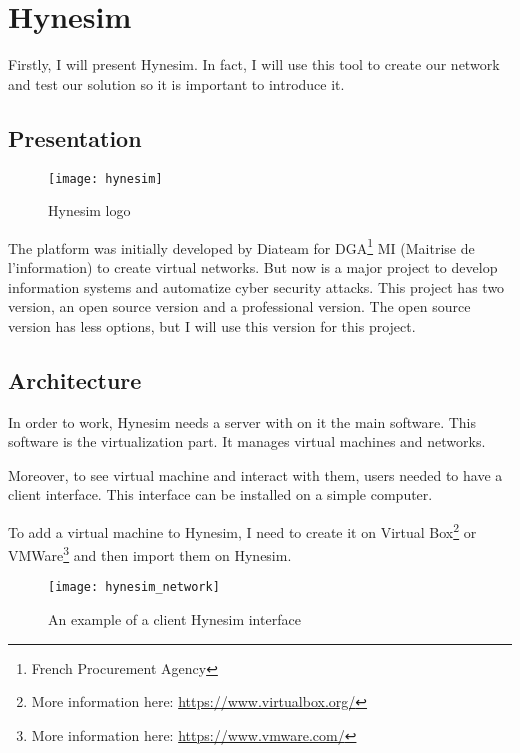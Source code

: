 
\chapter{Hynesim}
\label{chap:hynesim}

Firstly, I will present Hynesim. In fact, I will use this tool to create our network and test our solution so it is
important to introduce it.

\section{Presentation}

\begin{figure}[h]
  \centering
  \texttt{[image: hynesim]}
  \caption{Hynesim logo}
  \label{fig:hynesim}
\end{figure}



The platform was initially developed by Diateam for DGA\footnote{French Procurement Agency} MI (Maitrise de
l'information) to create virtual networks. But now is a major project to develop information systems and automatize
cyber security attacks. This project has two version, an open source version and a professional version. The open
source version has less options, but I will use this version for this project.

\section{Architecture}

In order to work, Hynesim needs a server with on it the main software. This software is the virtualization part. It
manages virtual machines and networks.

Moreover, to see virtual machine and interact with them, users needed to have a client interface. This interface
can be installed on a simple computer.

To add a virtual machine to Hynesim, I need to create it on Virtual Box\footnote{More information here:
  \url{https://www.virtualbox.org/}} or VMWare\footnote{More information here: \url{https://www.vmware.com/}} and
then import them on Hynesim.

\begin{figure}[h]
  \centering
  \texttt{[image: hynesim\_network]}
  \caption{An example of a client Hynesim interface}
\end{figure}





